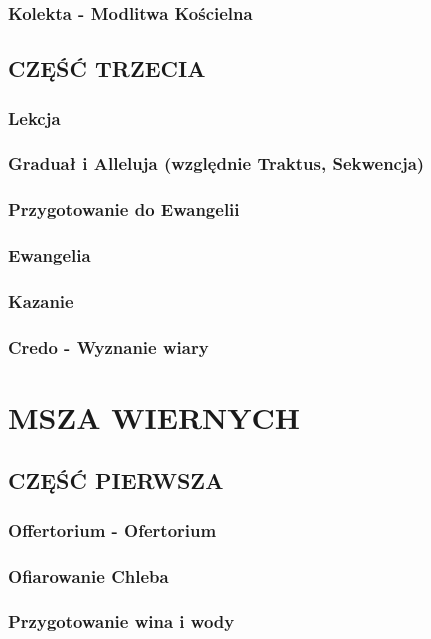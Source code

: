 \documentclass[10pt,titlepage]{article}
\begin{document}
	\subsubsection{Kolekta - Modlitwa Kościelna}
	
	\subsection{CZĘŚĆ TRZECIA}
	
	\subsubsection{Lekcja }
	\subsubsection{Graduał i Alleluja (względnie Traktus, Sekwencja)}
	\subsubsection{Przygotowanie do Ewangelii}
	\subsubsection{Ewangelia}
	\subsubsection{Kazanie}
	\subsubsection{Credo - Wyznanie wiary}
	
	\section{MSZA WIERNYCH}
	
	\subsection{CZĘŚĆ PIERWSZA}
	
	\subsubsection{Offertorium - Ofertorium}
	\subsubsection{Ofiarowanie Chleba}
	\subsubsection{Przygotowanie wina i wody}
\end{document}
